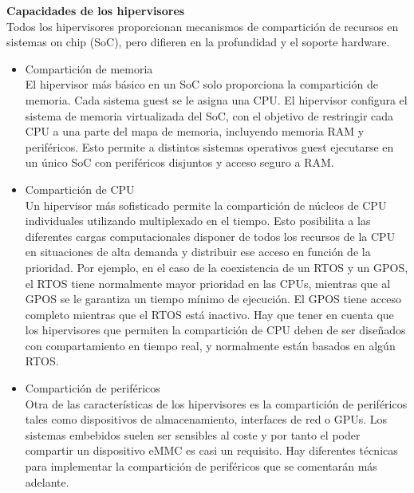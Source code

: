 \textbf{Capacidades de los hipervisores}\\
Todos los hipervisores proporcionan mecanismos de compartición de recursos en sistemas on chip (\acrshort{SoC}), pero difieren en la profundidad y el soporte hardware.
\begin{itemize}
	\item Compartición de memoria\\
	El hipervisor más básico en un \acrshort{SoC} solo proporciona la compartición de memoria. Cada sistema guest se le asigna una CPU. El hipervisor configura el sistema de memoria virtualizada del \acrshort{SoC}, con el objetivo de restringir cada CPU a una parte del mapa de memoria, incluyendo memoria RAM y periféricos. Esto permite a distintos sistemas operativos guest ejecutarse en un único \acrshort{SoC} con periféricos disjuntos y acceso seguro a \acrshort{RAM}.
	\item Compartición de CPU\\
	Un hipervisor más sofisticado permite la compartición de núcleos de CPU individuales utilizando multiplexado en el tiempo. Esto posibilita a las diferentes cargas computacionales disponer de todos los recursos de la CPU en situaciones de alta demanda y distribuir ese acceso en función de la prioridad. Por ejemplo, en el caso de la coexistencia de un \acrshort{RTOS} y un \acrshort{GPOS}, el \acrshort{RTOS} tiene normalmente mayor prioridad en las CPUs, mientras que al \acrshort{GPOS} se le garantiza un tiempo mínimo de ejecución. El \acrshort{GPOS} tiene acceso completo mientras que el \acrshort{RTOS} está inactivo. Hay que tener en cuenta que los hipervisores que permiten la compartición de CPU deben de ser diseñados con compartamiento en tiempo real, y normalmente están basados en algún \acrshort{RTOS}.
	\item Compartición de periféricos\\
	Otra de las características de los hipervisores es la compartición de periféricos tales como dispositivos de almacenamiento, interfaces de red o \acrshort{GPU}s. Los sistemas embebidos suelen ser sensibles al coste y por tanto el poder compartir un dispositivo \acrshort{eMMC} es casi un requisito. Hay diferentes técnicas para implementar la compartición de periféricos que se comentarán más adelante.
\end{itemize}

